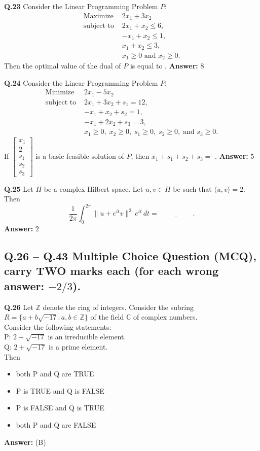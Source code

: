 \documentclass[11pt,a4paper]{article}
\newcommand{\optslistA}[4]{%
  \begin{itemize}
    \setlength{\itemsep}{2pt}\setlength{\parskip}{0pt}
    \item[(A)] #1
    \item[(B)] #2
    \item[(C)] #3
    \item[(D)] #4
  \end{itemize}%
}
\newcommand{\ans}[1]{\textbf{Answer:} #1\par\medskip}
\begin{document}
\textbf{Q.23} Consider the Linear Programming Problem $P$:
\begin{align*}
  \text{Maximize } & 2x_1 + 3x_2 \\
  \text{subject to } & 2x_1 + x_2 \le 6, \\
                     & -x_1 + x_2 \le 1, \\
                     & x_1 + x_2 \le 3, \\
                     & x_1 \ge 0 \text{ and } x_2 \ge 0.
\end{align*}
Then the optimal value of the dual of $P$ is equal to \underline{\hspace{2cm}}.
\ans{$8$}

\textbf{Q.24} Consider the Linear Programming Problem $P$:
\begin{align*}
  \text{Minimize } & 2x_1 - 5x_2 \\
  \text{subject to } & 2x_1 + 3x_2 + s_1 = 12, \\
                     & -x_1 + x_2 + s_2 = 1, \\
                     & -x_1 + 2x_2 + s_3 = 3, \\
                     & x_1 \ge 0,\; x_2 \ge 0,\; s_1 \ge 0,\; s_2 \ge 0,\; \text{and } s_3 \ge 0.
\end{align*}
If $\begin{bmatrix} x_1 \\ 2 \\ s_1 \\ s_2 \\ s_3 \end{bmatrix}$ is a basic feasible solution of $P$, then $x_1 + s_1 + s_2 + s_3 =$ \underline{\hspace{2cm}}.
\ans{$5$}

\textbf{Q.25} Let $H$ be a complex Hilbert space. Let $u, v \in H$ be such that $\langle u, v \rangle = 2$. Then
\[
  \frac{1}{2\pi} \int_0^{2\pi} \|u + e^{it} v\|^2\, e^{it}\,dt = \underline{\hspace{2cm}}.
\]
\ans{$2$}

\subsection*{Q.26 -- Q.43 Multiple Choice Question (MCQ), carry TWO marks each (for each wrong answer: $-2/3$).}

\textbf{Q.26} Let $\mathbb{Z}$ denote the ring of integers. Consider the subring $R = \{a + b\sqrt{-17} : a, b \in \mathbb{Z}\}$ of the field $\mathbb{C}$ of complex numbers.\\
Consider the following statements:\\
P: $2 + \sqrt{-17}$ is an irreducible element.\\
Q: $2 + \sqrt{-17}$ is a prime element.\\
Then
\optslistA{both P and Q are TRUE}{P is TRUE and Q is FALSE}{P is FALSE and Q is TRUE}{both P and Q are FALSE}
\ans{(B)}
\end{document}
